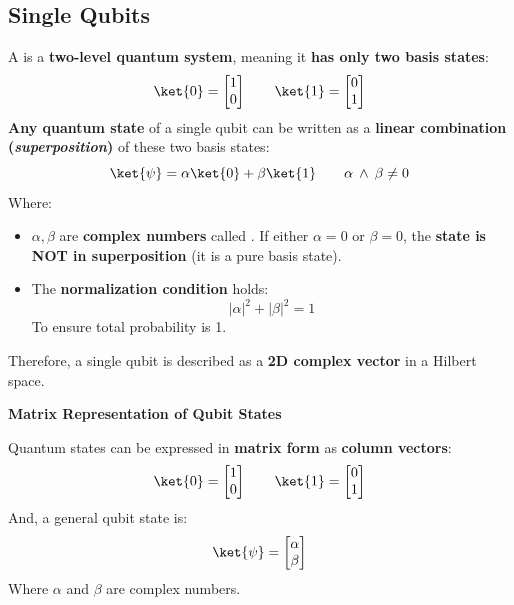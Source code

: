 \subsection{Single Qubits}\label{subsection: Single Qubits}

A  is a \textbf{two-level quantum system}, meaning it \textbf{has only two basis states}:
\begin{equation*}
    \ket{0} = \begin{bmatrix}
        1 \\ 0
    \end{bmatrix}
    \hspace{2em}
    \ket{1} = \begin{bmatrix}
        0 \\ 1
    \end{bmatrix}
\end{equation*}
\textbf{Any quantum state} of a single qubit can be written as a \textbf{linear combination (\emph{superposition})} of these two basis states:
\begin{equation*}
    \ket{\psi} = \alpha \ket{0} + \beta \ket{1} \hspace{2em} \alpha \: \land \: \beta \ne 0
\end{equation*}
Where:
\begin{itemize}
    \item $\alpha, \beta$ are \textbf{complex numbers} called . If either $\alpha = 0$ or $\beta = 0$, the \textbf{state is NOT in superposition} (it is a pure basis state).
    \item The \textbf{normalization condition} holds:
    \begin{equation*}
        \left|\alpha\right|^{2} + \left|\beta\right|^{2} = 1
    \end{equation*}
    To ensure total probability is 1.
\end{itemize}
Therefore, a single qubit is described as a \textbf{2D complex vector} in a Hilbert space.

\begin{flushleft}
    \textcolor{Green3}{ \textbf{Matrix Representation of Qubit States}}
\end{flushleft}
Quantum states can be expressed in \textbf{matrix form} as \textbf{column vectors}:
\begin{equation*}
    \ket{0} = \begin{bmatrix}
        1 \\ 0
    \end{bmatrix}
    \hspace{2em}
    \ket{1} = \begin{bmatrix}
        0 \\ 1
    \end{bmatrix}
\end{equation*}
And, a general qubit state is:
\begin{equation*}
    \ket{\psi} = \begin{bmatrix}
        \alpha \\ \beta
    \end{bmatrix}
\end{equation*}
Where $\alpha$ and $\beta$ are complex numbers.

